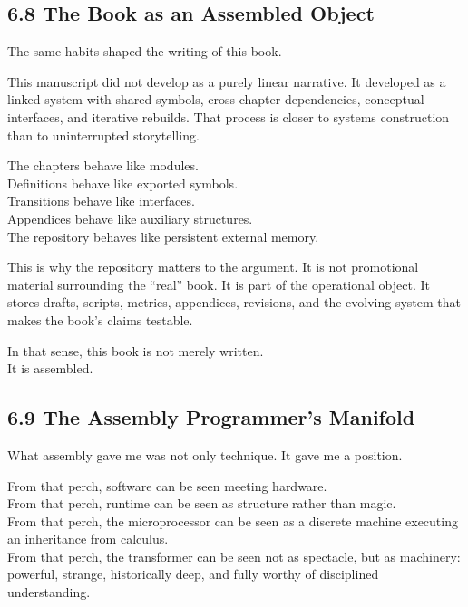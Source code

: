 \documentclass[
]{article}
\begin{document}
\hypertarget{the-book-as-an-assembled-object}{%
\subsection{6.8 The Book as an Assembled
Object}\label{the-book-as-an-assembled-object}}

The same habits shaped the writing of this book.

This manuscript did not develop as a purely linear narrative. It
developed as a linked system with shared symbols, cross-chapter
dependencies, conceptual interfaces, and iterative rebuilds. That
process is closer to systems construction than to uninterrupted
storytelling.

The chapters behave like modules.\\
Definitions behave like exported symbols.\\
Transitions behave like interfaces.\\
Appendices behave like auxiliary structures.\\
The repository behaves like persistent external memory.

This is why the repository matters to the argument. It is not
promotional material surrounding the ``real'' book. It is part of the
operational object. It stores drafts, scripts, metrics, appendices,
revisions, and the evolving system that makes the book's claims
testable.

In that sense, this book is not merely written.\\
It is assembled.

\hypertarget{the-assembly-programmers-manifold}{%
\subsection{6.9 The Assembly Programmer's
Manifold}\label{the-assembly-programmers-manifold}}

What assembly gave me was not only technique. It gave me a position.

From that perch, software can be seen meeting hardware.\\
From that perch, runtime can be seen as structure rather than magic.\\
From that perch, the microprocessor can be seen as a discrete machine
executing an inheritance from calculus.\\
From that perch, the transformer can be seen not as spectacle, but as
machinery: powerful, strange, historically deep, and fully worthy of
disciplined understanding.
\end{document}
